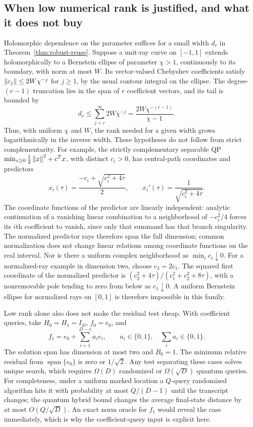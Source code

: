 \subsection{When low numerical rank is justified, and what it does not buy}
Holomorphic dependence on the parameter suffices for a small width $d_r$
in Theorem~\ref{thm:robust-reuse}.  Suppose
a unit-ray curve on $[-1,1]$ extends holomorphically to a Bernstein ellipse
of parameter $\chi>1$, continuously to its boundary, with norm at most
$W$.  Its vector-valued Chebyshev coefficients satisfy
$\left\lVert c_j\right\rVert\leq2W\chi^{-j}$ for $j\geq1$, by the usual contour
integral on the ellipse.  The degree-$(r-1)$ truncation lies in the span
of $r$ coefficient vectors, and its tail is bounded by
\begin{equation}\label{eq:analytic-width}
 d_r\leq\sum_{j=r}^{\infty}2W\chi^{-j}
       =\frac{2W\chi^{-(r-1)}}{\chi-1}.
\end{equation}
Thus, with uniform $\chi$ and $W$, the rank needed for a given width grows
logarithmically in the inverse width.  These hypotheses do not follow from
strict complementarity.
For example, the strictly complementary separable QP
$\min_{x\geq0}\frac12\left\lVert x\right\rVert^2+c^Tx$, with distinct $c_i>0$, has
central-path coordinates and predictors
\[
 x_i(\tau)=\frac{-c_i+\sqrt{c_i^2+4\tau}}2,
 \qquad x_i'(\tau)=\frac1{\sqrt{c_i^2+4\tau}}.
\]
The coordinate functions of the predictor are linearly independent:
analytic continuation of a vanishing linear combination to a neighborhood
of $-c_i^2/4$ forces its $i$th coefficient to vanish, since only that
summand has that branch singularity.  The normalized predictor rays
therefore span the full dimension; common normalization does not change
linear relations among coordinate functions on the real interval.
Nor is there a uniform complex neighborhood as
$\min_i c_i\downarrow0$.
For a normalized-ray example in dimension two, choose $c_2=2c_1$.
The squared first coordinate of the normalized predictor is
$(c_2^2+4\tau)/(c_1^2+c_2^2+8\tau)$, with a nonremovable pole
tending to zero from below as $c_1\downarrow0$.  A uniform Bernstein ellipse for normalized rays on
$[0,1]$ is therefore impossible in this family.

Low rank alone also does not make the residual test cheap.  With
coefficient queries, take $H_0=H_1=I_D$, $f_0=e_0$, and
\[
 f_1=e_0+\sum_{i=1}^{D-1}a_i e_i,\qquad a_i\in\{0,1\},
 \quad\sum_i a_i\in\{0,1\}.
\]
The solution span has dimension at most two and $B_0=1$.
The minimum relative residual from $\operatorname{span}\{e_0\}$ is zero
or $1/\sqrt2$.  Any test separating these cases solves unique search,
which requires $\Omega(D)$ randomized or $\Omega(\sqrt D)$ quantum queries.
For completeness, under a uniform marked location a $Q$-query randomized
algorithm hits it with probability at most $Q/(D-1)$ until the transcript
changes; the quantum hybrid bound changes the average final-state distance
by at most $O(Q/\sqrt D)$.
An exact norm oracle for $f_1$ would reveal the case immediately, which is
why the coefficient-query input is explicit here.

